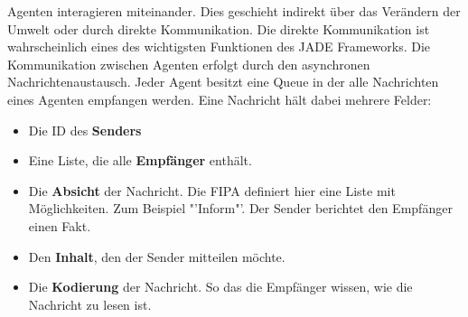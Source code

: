 Agenten interagieren miteinander. Dies geschieht indirekt über das Verändern der Umwelt oder durch direkte Kommunikation. Die direkte Kommunikation ist wahrscheinlich eines des wichtigsten Funktionen des JADE Frameworks. Die Kommunikation zwischen Agenten erfolgt durch den asynchronen Nachrichtenaustausch. Jeder Agent besitzt eine Queue in der alle Nachrichten eines Agenten empfangen werden. Eine Nachricht hält dabei mehrere Felder:
\begin{itemize}
\item Die ID des \textbf{Senders}
\item Eine Liste, die alle \textbf{Empfänger} enthält.
\item Die \textbf{Absicht} der Nachricht. Die FIPA definiert hier eine Liste mit Möglichkeiten. Zum Beispiel "'Inform"'. Der Sender berichtet den Empfänger einen Fakt.
\item Den \textbf{Inhalt}, den der Sender mitteilen möchte.
\item Die \textbf{Kodierung} der Nachricht. So das die Empfänger wissen, wie die Nachricht zu lesen ist.
\end{itemize} \cite{book:jade}
